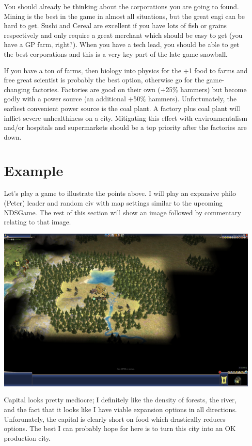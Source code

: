 \documentclass[10pt]{article}
\begin{document}
You should already be thinking about the corporations you are going to
found. Mining is the best in the game in almost all situations, but
the great engi can be hard to get. Sushi and Cereal are excellent if
you have lots of fish or grains respectively and only require a great
merchant which should be easy to get (you have a GP farm,
right?). When you have a tech lead, you should be able to get the best
corporations and this is a very key part of the late game snowball.

If you have a ton of farms, then biology into physics for the +1 food
to farms and free great scientist is probably the best option,
otherwise go for the game-changing factories. Factories are good on
their own (+25\% hammers) but become godly with a power source (an
additional +50\% hammers). Unfortunately, the earliest convenient
power source is the coal plant. A factory plus coal plant will inflict
severe unhealthiness on a city. Mitigating this effect with
environmentalism and/or hospitals and supermarkets should be a top
priority after the factories are down.

\section*{Example}

Let's play a game to illustrate the points above. I will play an
expansive philo (Peter) leader and random civ with map settings similar to
the upcoming NDSGame. The rest of this section will show an image followed
by commentary relating to that image.

\graphicspath{{images/}}

\includegraphics[width=1.0\textwidth]{1}

Capital looks pretty mediocre; I definitely like the density of forests, the river,
and the fact that it looks like I have viable expansion options in all directions.
Unforunately, the capital is clearly short on food which drastically reduces options.
The best I can probably hope for here is to turn this city into an OK production city.
\end{document}

